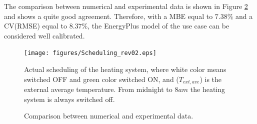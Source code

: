 The comparison between numerical and experimental data is shown in Figure \ref{F:houseComparisonExperimental} and shows a quite good agreement. Therefore, with a MBE equal to $7.38\%$ and a CV(RMSE) equal to $8.37\%$, the EnergyPlus model of the use case can be considered well calibrated.  
\begin{figure}[t!]
	\begin{center}
		\texttt{[image: figures/Scheduling\_rev02.eps]}
		\caption{Actual scheduling of the heating system, where white color means switched OFF and green color switched ON, and ($T_{ext,ave}$) is the external average temperature. From midnight to $8am$ the heating system is always switched off.}
		\captionsetup{justification=centering}
		\label{F:houseActualScheduling}
	\end{center}
\end{figure}
\begin{figure}[t!]
	\begin{center}
	\end{center}
	\caption{Comparison between numerical and experimental data.}
	\captionsetup{justification=centering}
	\label{F:houseComparisonExperimental}
\end{figure}
